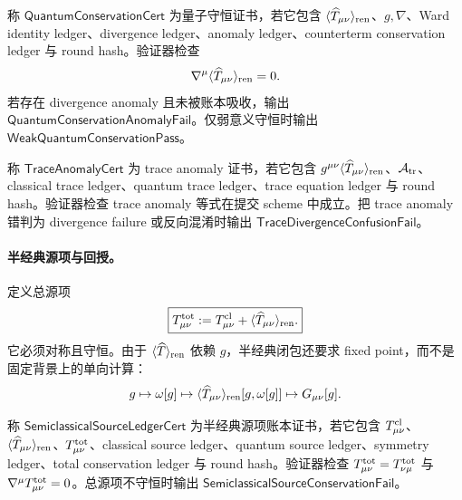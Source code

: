 \begin{definition}[量子守恒证书]\label{def:typed-address-biaxial-completion-quantum-conservation-cert}
称 \(\mathsf{QuantumConservationCert}\) 为量子守恒证书，若它包含 \(\langle\widehat T_{\mu\nu}\rangle_{\rm ren}\)、\(g,\nabla\)、Ward identity ledger、divergence ledger、anomaly ledger、counterterm conservation ledger 与 round hash。验证器检查
\[
\nabla^\mu\langle\widehat T_{\mu\nu}\rangle_{\rm ren}=0.
\]
若存在 divergence anomaly 且未被账本吸收，输出 \(\mathsf{QuantumConservationAnomalyFail}\)。仅弱意义守恒时输出 \(\mathsf{WeakQuantumConservationPass}\)。
\end{definition}

\begin{definition}\label{def:typed-address-biaxial-completion-trace-anomaly-cert}
称 \(\mathsf{TraceAnomalyCert}\) 为 trace anomaly 证书，若它包含 \(g^{\mu\nu}\langle\widehat T_{\mu\nu}\rangle_{\rm ren}\)、\(\mathcal A_{\rm tr}\)、classical trace ledger、quantum trace ledger、trace equation ledger 与 round hash。验证器检查 trace anomaly 等式在提交 scheme 中成立。把 trace anomaly 错判为 divergence failure 或反向混淆时输出 \(\mathsf{TraceDivergenceConfusionFail}\)。
\end{definition}

\paragraph{半经典源项与回授。}
定义总源项
\[
\boxed{
T^{\rm tot}_{\mu\nu}
:=
T^{\rm cl}_{\mu\nu}
+
\langle\widehat T_{\mu\nu}\rangle_{\rm ren}.
}
\]
它必须对称且守恒。由于 \(\langle\widehat T\rangle_{\rm ren}\) 依赖 \(g\)，半经典闭包还要求 fixed point，而不是固定背景上的单向计算：
\[
g\mapsto\omega[g]\mapsto
\langle\widehat T_{\mu\nu}\rangle_{\rm ren}[g,\omega[g]]
\mapsto G_{\mu\nu}[g].
\]

\begin{definition}[半经典源项账本证书]\label{def:typed-address-biaxial-completion-semiclassical-source-ledger-cert}
称 \(\mathsf{SemiclassicalSourceLedgerCert}\) 为半经典源项账本证书，若它包含 \(T^{\rm cl}_{\mu\nu}\)、\(\langle\widehat T_{\mu\nu}\rangle_{\rm ren}\)、\(T^{\rm tot}_{\mu\nu}\)、classical source ledger、quantum source ledger、symmetry ledger、total conservation ledger 与 round hash。验证器检查 \(T^{\rm tot}_{\mu\nu}=T^{\rm tot}_{\nu\mu}\) 与 \(\nabla^\mu T^{\rm tot}_{\mu\nu}=0\)。总源项不守恒时输出 \(\mathsf{SemiclassicalSourceConservationFail}\)。
\end{definition}

